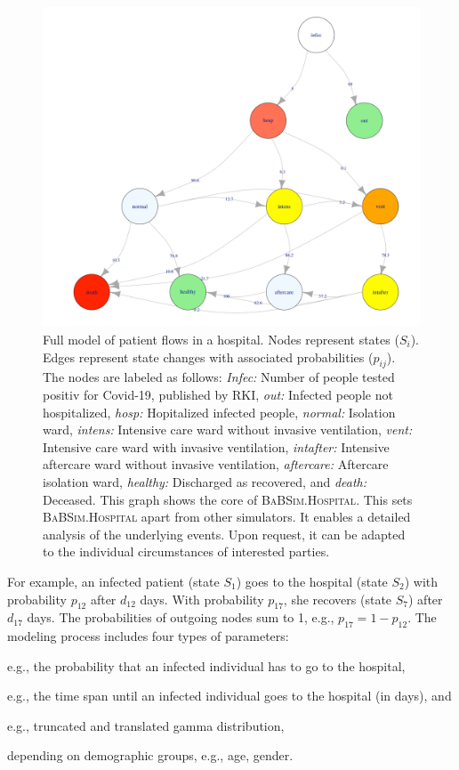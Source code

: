 \documentclass[conference]{IEEEtran}
\newcommand{\babsimhospital}{\textsc{BaBSim.Hospital}\xspace}
\renewenvironment{description}[0]{\begin{compactdesc}}{\end{compactdesc}}
\begin{document}
\begin{figure}
    \centering
    \includegraphics[width=0.75\linewidth]{prob.png}
    \caption{Full model of patient flows in a hospital. Nodes represent states ($S_i$). Edges represent state changes with associated probabilities ($p_{ij}$). The nodes are labeled as follows: \emph{Infec:}\/ Number of people tested positiv for Covid-19, published by RKI, 
\emph{out:}\/ Infected people not hospitalized, \emph{hosp:}\/ Hopitalized infected people, \emph{normal:}\/ Isolation ward, \emph{intens:}\/ Intensive care ward without invasive ventilation, \emph{vent:}\/ Intensive care ward with invasive ventilation, \emph{intafter:}\/ Intensive aftercare ward without invasive ventilation, \emph{aftercare:}\/ Aftercare isolation ward, \emph{healthy:}\/ Discharged as recovered, and \emph{death:}\/ Deceased.
This graph shows the core of \babsimhospital. This sets \babsimhospital apart from other simulators. It enables a detailed analysis of the underlying events. Upon request, it can be adapted to the individual circumstances of interested parties.}
\label{fig:prob}
\end{figure}


For example, an infected patient (state $S_1$) goes to the hospital (state $S_2$) with probability $p_{12}$ after $d_{12}$ days. With probability $p_{17}$, she recovers (state $S_7$) after $d_{17}$ days. 
The probabilities of outgoing nodes sum to 1, e.g., $p_{17} = 1 - p_{12}$.
The modeling process includes four types of parameters: 
\begin{description}
\item[transition probabilities,] e.g., the probability that an infected individual has to go to the hospital,
\item[durations,] e.g., the time span until an infected individual goes to the hospital (in days), and
\item[distribution properties,] e.g., truncated and translated gamma distribution,
\item[risk factors] depending on demographic groups, e.g., age, gender. 
\end{description}
\end{document}
